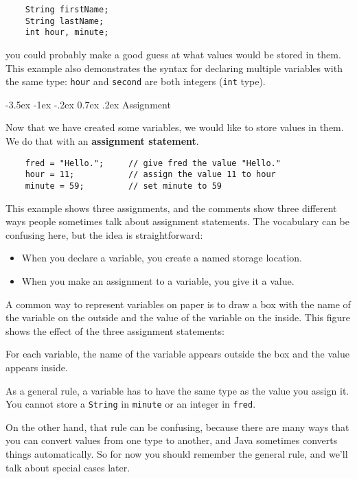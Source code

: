 \documentclass{book}
\makeatletter
\renewcommand{\section}{\@startsection 
    {section} {1} {0mm}%
    {-3.5ex \@plus -1ex \@minus -.2ex}%
    {0.7ex \@plus.2ex}%
    {\normalfont\Large\bfseries}}
\newcommand{\beforefig}{\vspace{1.3\parskip}}
\newcommand{\afterfig}{\vspace{-0.2\parskip}}
\newcommand{\myfig}[1]{
    \beforefig
    \centerline{\epsfig{#1,scale=0.8}}
    \afterfig
}
\makeatother
\begin{document}
\begin{verbatim}
    String firstName;
    String lastName;
    int hour, minute;
\end{verbatim}
%
you could probably make a good guess at what values
would be stored in them.  This example
also demonstrates the syntax for declaring multiple variables
with the same type: {\tt hour} and {\tt second}
are both integers ({\tt int} type).

\section{Assignment}

Now that we have created some variables, we would like to
store values in them.  We do that with an {\bf assignment
statement}.

\begin{verbatim}
    fred = "Hello.";     // give fred the value "Hello."
    hour = 11;           // assign the value 11 to hour
    minute = 59;         // set minute to 59
\end{verbatim}
%
This example shows three assignments, and the comments show
three different ways people sometimes talk about assignment
statements.  The vocabulary can be confusing here, but the
idea is straightforward:

\begin{itemize}

\item When you declare a variable, you create a named storage location.

\item When you make an assignment to a variable, you give it a value.

\end{itemize}

A common way to represent variables on paper is to draw a box
with the name of the variable on the outside and the value
of the variable on the inside.  This figure shows
the effect of the three assignment statements:


\myfig{figure=figs/assign.eps}


For each variable, the name of the variable appears outside the
box and the value appears inside.

As a general rule,
a variable has to have the same type as the
value you assign it.  You cannot store a {\tt String} in {\tt minute} or an
integer in {\tt fred}.

On the other hand, that rule can be confusing, because there are many
ways that you can convert values from one type to another, and Java
sometimes converts things automatically.  So for now you should
remember the general rule, and we'll talk about special cases later.
\end{document}
